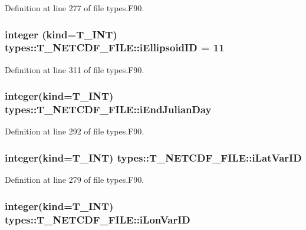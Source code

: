 Definition at line 277 of file types.F90.

\hypertarget{typetypes_1_1_t___n_e_t_c_d_f___f_i_l_e_ac7c2db95732921f3b0deb1913d6c42aa}{
\subsubsection[{iEllipsoidID}]{\setlength{\rightskip}{0pt plus 5cm}integer (kind={\bf T\_\-INT}) {\bf types::T\_\-NETCDF\_\-FILE::iEllipsoidID} = 11}}
\label{typetypes_1_1_t___n_e_t_c_d_f___f_i_l_e_ac7c2db95732921f3b0deb1913d6c42aa}


Definition at line 311 of file types.F90.

\hypertarget{typetypes_1_1_t___n_e_t_c_d_f___f_i_l_e_a9e8f97f647adeb5779e116581c1a6838}{
\subsubsection[{iEndJulianDay}]{\setlength{\rightskip}{0pt plus 5cm}integer(kind={\bf T\_\-INT}) {\bf types::T\_\-NETCDF\_\-FILE::iEndJulianDay}}}
\label{typetypes_1_1_t___n_e_t_c_d_f___f_i_l_e_a9e8f97f647adeb5779e116581c1a6838}


Definition at line 292 of file types.F90.

\hypertarget{typetypes_1_1_t___n_e_t_c_d_f___f_i_l_e_a37a2843343c58dc42636222137864ba5}{
\subsubsection[{iLatVarID}]{\setlength{\rightskip}{0pt plus 5cm}integer(kind={\bf T\_\-INT}) {\bf types::T\_\-NETCDF\_\-FILE::iLatVarID}}}
\label{typetypes_1_1_t___n_e_t_c_d_f___f_i_l_e_a37a2843343c58dc42636222137864ba5}


Definition at line 279 of file types.F90.

\hypertarget{typetypes_1_1_t___n_e_t_c_d_f___f_i_l_e_aeebeac80059d7619c0169118f8d30371}{
\subsubsection[{iLonVarID}]{\setlength{\rightskip}{0pt plus 5cm}integer(kind={\bf T\_\-INT}) {\bf types::T\_\-NETCDF\_\-FILE::iLonVarID}}}
\label{typetypes_1_1_t___n_e_t_c_d_f___f_i_l_e_aeebeac80059d7619c0169118f8d30371}


